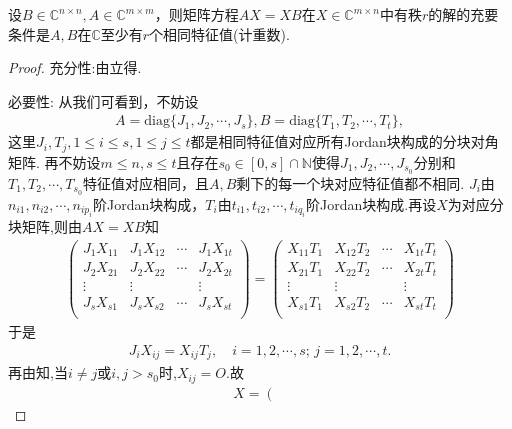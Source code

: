\documentclass[../../main.tex]{subfiles}%
\begin{document}
\begin{corollary}\label{corollary:矩阵方程相关推论}
设$B\in\mathbb{C}^{n\times n}, A\in\mathbb{C}^{m\times m}$，则矩阵方程$AX = XB$在$X\in\mathbb{C}^{m\times n}$中有秩$r$的解的充要条件是$A,B$在$\mathbb{C}$至少有$r$个相同特征值(计重数).
\end{corollary}
\begin{proof}

{\heiti 充分性:}由立得.

{\heiti 必要性:}
从我们可看到，不妨设
\begin{align*}
A = \mathrm{diag}\{J_1, J_2, \cdots, J_s\}, B = \mathrm{diag}\{T_1, T_2, \cdots, T_t\},
\end{align*}
这里$J_i, T_j, 1\leqslant i\leqslant s, 1\leqslant j\leqslant t$都是相同特征值对应所有Jordan块构成的分块对角矩阵. 再不妨设$m\leqslant n,s\leqslant t$且存在$s_0\in [0,s]\cap \mathbb{N}$使得$J_1, J_2, \cdots, J_{s_0}$分别和$T_1, T_2, \cdots, T_{s_0}$特征值对应相同，且$A,B$剩下的每一个块对应特征值都不相同. $J_i$由$n_{i1}, n_{i2}, \cdots, n_{ip_i}$阶Jordan块构成，$T_i$由$t_{i1}, t_{i2}, \cdots, t_{iq_i}$阶Jordan块构成.再设$X$为对应分块矩阵,则由$AX = XB$知
\begin{align*}
\left( \begin{matrix}
J_1X_{11}&		J_1X_{12}&		\cdots&		J_1X_{1t}\\
J_2X_{21}&		J_2X_{22}&		\cdots&		J_2X_{2t}\\
\vdots&		\vdots&		&		\vdots\\
J_sX_{s1}&		J_sX_{s2}&		\cdots&		J_sX_{st}\\
\end{matrix} \right) =\left( \begin{matrix}
X_{11}T_1&		X_{12}T_2&		\cdots&		X_{1t}T_t\\
X_{21}T_1&		X_{22}T_2&		\cdots&		X_{2t}T_t\\
\vdots&		\vdots&		&		\vdots\\
X_{s1}T_1&		X_{s2}T_2&		\cdots&		X_{st}T_t\\
\end{matrix} \right) 
\end{align*}
于是
\begin{align*}
J_iX_{ij}=X_{ij}T_j,\quad i=1,2,\cdots ,s;\,j=1,2,\cdots ,t.
\end{align*}
再由知,当$i\ne j$或$i,j> s_0$时,$X_{ij}=O.$故
\begin{align*}
X=\left( \begin{matrix}

\end{matrix}
\end{align*}
\end{proof}
\end{document}
